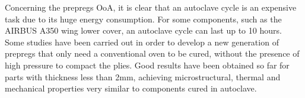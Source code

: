 Concerning the prepregs OoA, it is clear that an autoclave cycle is an
expensive task due to its huge energy consumption. For some components, such as
the AIRBUS A350 wing lower cover, an autoclave cycle can last up to 10 hours.
Some studies have been carried
out in order to develop a new generation of prepregs that only need a conventional
oven to be cured, without the presence of high pressure to compact the plies.
Good results have been
obtained so far for parts with thickness less than 2mm, achieving microstructural,
thermal and mechanical properties very similar to components cured in autoclave.\\
